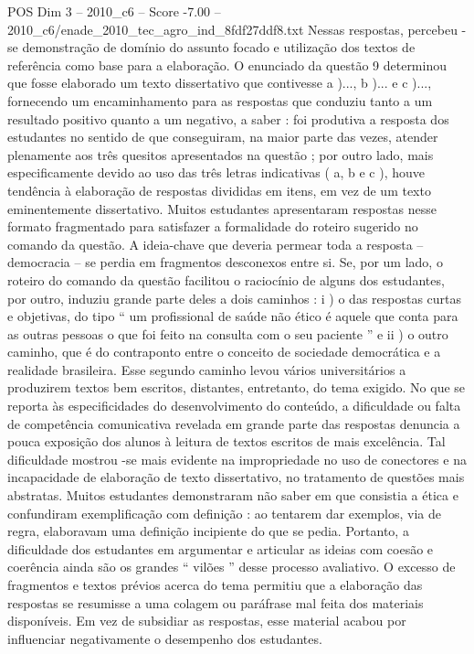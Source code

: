\begin{textsample}{POS Dim 3 – 2010\_c6 – Score -7.00 – 2010\_c6/enade\_2010\_tec\_agro\_ind\_8fdf27ddf8.txt}
Nessas respostas, percebeu -se demonstração de domínio do assunto focado e utilização dos textos de referência como base para a elaboração.
O enunciado da questão 9 determinou que fosse elaborado um texto dissertativo que contivesse a )..., b )... e c )..., fornecendo um encaminhamento para as respostas que conduziu tanto a um resultado positivo quanto a um negativo, a saber : foi produtiva a resposta dos estudantes no sentido de que conseguiram, na maior parte das vezes, atender plenamente aos três quesitos apresentados na questão ; por outro lado, mais especificamente devido ao uso das três letras indicativas ( a, b e c ), houve tendência à elaboração de respostas divididas em itens, em vez de um texto eminentemente dissertativo.
Muitos estudantes apresentaram respostas nesse formato fragmentado para satisfazer a formalidade do roteiro sugerido no comando da questão.
A ideia-chave que deveria permear toda a resposta – democracia – se perdia em fragmentos desconexos entre si.
Se, por um lado, o roteiro do comando da questão facilitou o raciocínio de alguns dos estudantes, por outro, induziu grande parte deles a dois caminhos : i ) o das respostas curtas e objetivas, do tipo “ um profissional de saúde não ético é aquele que conta para as outras pessoas o que foi feito na consulta com o seu paciente ” e ii ) o outro caminho, que é do contraponto entre o conceito de sociedade democrática e a realidade brasileira.
Esse segundo caminho levou vários universitários a produzirem textos bem escritos, distantes, entretanto, do tema exigido.
No que se reporta às especificidades do desenvolvimento do conteúdo, a dificuldade ou falta de competência comunicativa revelada em grande parte das respostas denuncia a pouca exposição dos alunos à leitura de textos escritos de mais excelência.
Tal dificuldade mostrou -se mais evidente na impropriedade no uso de conectores e na incapacidade de elaboração de texto dissertativo, no tratamento de questões mais abstratas.
Muitos estudantes demonstraram não saber em que consistia a ética e confundiram exemplificação com definição : ao tentarem dar exemplos, via de regra, elaboravam uma definição incipiente do que se pedia.
Portanto, a dificuldade dos estudantes em argumentar e articular as ideias com coesão e coerência ainda são os grandes “ vilões ” desse processo avaliativo.
O excesso de fragmentos e textos prévios acerca do tema permitiu que a elaboração das respostas se resumisse a uma colagem ou paráfrase mal feita dos materiais disponíveis.
Em vez de subsidiar as respostas, esse material acabou por influenciar negativamente o desempenho dos estudantes.

\end{textsample}
